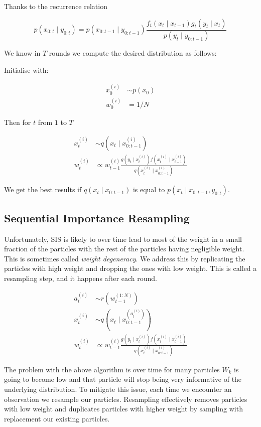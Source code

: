\documentclass[
]{ceurart}
\begin{document}
Thanks to the recurrence relation

\begin{equation}
p(x_{0:t} \mid y_{0:t}) = p(x_{0:t-1} \mid y_{0:t-1}) \frac{f_t(x_t \mid x_{t-1}) g_t(y_t \mid x_t)}{p(y_t \mid y_{0:t-1})}
\end{equation}

We know in $T$ rounds we compute the desired distribution as follows:

Initialise with:

\begin{align*}
x_0^{(i)} &\sim p(x_0) \\
w_0^{(i)} &= 1/N
\end{align*}

Then for $t$ from $1$ to $T$

\begin{align*}
  x_t^{(i)} &\sim q(x_t \mid x^{(i)}_{0:t-1}) \\
  w_t^{(i)} &\propto w_{t-1}^{(i)} \frac{g(y_t \mid x^{(i)}_t)f(x^{(i)}_t \mid x^{(i)}_{t-1})}{q(x^{(i)}_t \mid x^{(i)}_{0:t-1})}
\end{align*}

We get the best results if $q(x_t \mid x_{0:t-1})$ is equal to $p(x_t \mid x_{0:t-1}, y_{0:t})$.

\subsection{Sequential Importance Resampling}

Unfortunately, SIS is likely to over time lead to most of the weight
in a small fraction of the particles with the rest of the particles
having negligible weight. This is sometimes called \emph{weight degeneracy}. We
address this by replicating the particles with high weight and
dropping the ones with low weight. This is called a resampling step,
and it happens after each round.

\begin{align*}
  a_t^{(i)} &\sim r(w_{t-1}^{(1:N)}) \\
  x_t^{(i)} &\sim q(x_t \mid x^{(a_t^{(i)})}_{0:t-1}) \\
  w_t^{(i)} &\propto w_{t-1}^{(i)} \frac{g(y_t \mid x^{(i)}_t)f(x^{(i)}_t \mid x^{(i)}_{t-1})}{q(x^{(i)}_t \mid x^{(i)}_{0:t-1})}
\end{align*}

The problem with the above algorithm is over time for many particles
$W_k$ is going to become low and that particle will stop being very
informative of the underlying distribution. To mitigate this issue,
each time we encounter an observation we resample our particles. Resampling
effectively removes particles with low weight and duplicates particles
with higher weight by sampling with replacement our existing particles.
\end{document}
